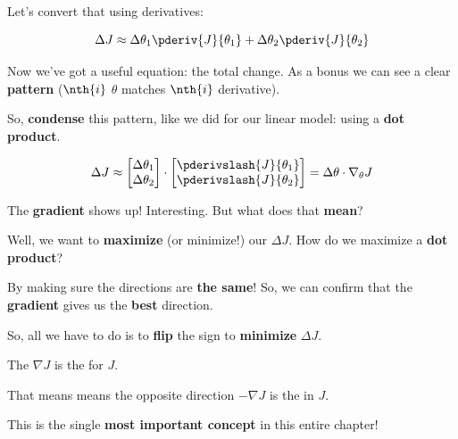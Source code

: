         Let's convert that using derivatives:
        
        \begin{equation}
            \Delta J \approx
            \Delta \theta_1 \pderiv{J}{\theta_1} +
            \Delta \theta_2 \pderiv{J}{\theta_2}
        \end{equation}
        
        Now we've got a useful equation: the total change. As a bonus we can see a clear \textbf{pattern} ($\nth{i}$ $\theta$ matches $\nth{i}$ derivative). 
        
        So, \textbf{condense} this pattern, like we did for our linear model: using a \textbf{dot product}.
        
        \begin{equation}
            \Delta J 
            \approx 
            \begin{bmatrix}
              \Delta \theta_1 \\ \Delta \theta_2
            \end{bmatrix}
            \cdot
            \begin{bmatrix}
                \pderivslash{J}{ \theta_1}  \\ 
                \pderivslash{J}{ \theta_2 } 
            \end{bmatrix}
            =
            \Delta \theta \cdot \nabla_\theta J
        \end{equation}
        
        The \textbf{gradient} shows up! Interesting. But what does that \textbf{mean}?
        
        Well, we want to \textbf{maximize} (or minimize!) our $\Delta J$. How do we maximize a \textbf{dot product}?
        
        By making sure the directions are \textbf{the same}! So, we can confirm that the \textbf{gradient} gives us the \textbf{best} direction.
        
        So, all we have to do is to \textbf{flip} the sign to \textbf{minimize} $\Delta J$.
            \\
        
        \begin{concept}
            The  $\nabla J$ is the  for $J$.
            
            That means means the opposite direction $-\nabla J$ is the  in $J$.
        \end{concept}
        
        This is the single \textbf{most important concept} in this entire chapter!
        